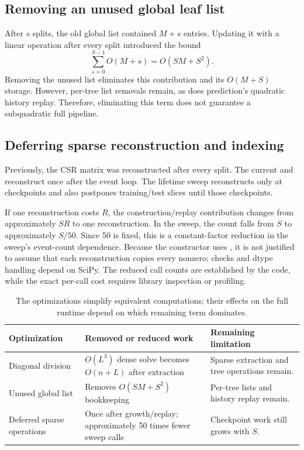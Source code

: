 \documentclass[11pt]{article}
\newcommand{\code}[1]{\texttt{\detokenize{#1}}}
\begin{document}
\subsection{Removing an unused global leaf list}

After $s$ splits, the old global list contained $M+s$ entries. Updating it with a linear \code{remove} operation after every split introduced the bound
\begin{equation}
\sum_{s=0}^{S-1}O(M+s)=O(SM+S^2).
\end{equation}
Removing the unused list eliminates this contribution and its $O(M+S)$ storage. However, per-tree list removals remain, as does prediction's quadratic history replay. Therefore, eliminating this term does not guarantee a subquadratic full pipeline.

\subsection{Deferring sparse reconstruction and indexing}

Previously, the CSR matrix was reconstructed after every split. The current \code{train} and \code{evaluate} reconstruct once after the event loop. The lifetime sweep reconstructs only at checkpoints and also postpones training/test slices until those checkpoints.

If one reconstruction costs $R$, the construction/replay contribution changes from approximately $SR$ to one reconstruction. In the sweep, the count falls from $S$ to approximately $S/50$. Since 50 is fixed, this is a constant-factor reduction in the sweep's event-count dependence. Because the constructor uses \code{copy=False}, it is not justified to assume that each reconstruction copies every nonzero; checks and dtype handling depend on SciPy. The reduced call counts are established by the code, while the exact per-call cost requires library inspection or profiling.

\begin{table}[htbp]
\centering\small
\begin{tabularx}{\textwidth}{YYY}
\toprule
Optimization & Removed or reduced work & Remaining limitation \\
\midrule
Diagonal division & $O(L^3)$ dense solve becomes $O(n+L)$ after extraction & Sparse extraction and tree operations remain. \\
Unused global list & Removes $O(SM+S^2)$ bookkeeping & Per-tree lists and history replay remain. \\
Deferred sparse operations & Once after growth/replay; approximately 50 times fewer sweep calls & Checkpoint work still grows with $S$. \\
\bottomrule
\end{tabularx}
\caption{The optimizations simplify equivalent computations; their effects on the full runtime depend on which remaining term dominates.}
\end{table}
\end{document}
